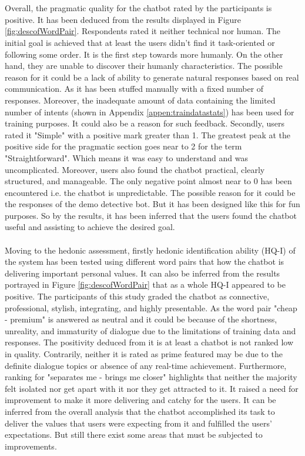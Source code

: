 \\~\\
Overall, the pragmatic quality for the chatbot rated by the participants is positive. It has been deduced from the results displayed in Figure \ref{fig:descofWordPair}. Respondents rated it neither technical nor human. The initial goal is achieved that at least the users didn't find it task-oriented or following some order. It is the first step towards more humanly. On the other hand, they are unable to discover their humanly characteristics. The possible reason for it could be a lack of ability to generate natural responses based on real communication. As it has been stuffed manually with a fixed number of responses. Moreover, the inadequate amount of data containing the limited number of intents (shown in Appendix \ref{appen:traindatastats}) has been used for training purposes. It could also be a reason for such feedback. Secondly, users rated it "Simple" with a positive mark greater than 1. The greatest peak at the positive side for the pragmatic section goes near to 2 for the term "Straightforward". Which means it was easy to understand and was uncomplicated. Moreover, users also found the chatbot practical, clearly structured, and manageable. The only negative point almost near to 0 has been encountered i.e. the chatbot is unpredictable. The possible reason for it could be the responses of the demo detective bot. But it has been designed like this for fun purposes. So by the results, it has been inferred that the users found the chatbot useful and assisting to achieve the desired goal.
\\~\\
Moving to the hedonic assessment, firstly hedonic identification ability (HQ-I) of the system has been tested using different word pairs that how the chatbot is delivering important personal values. It can also be inferred from the results portrayed in Figure \ref{fig:descofWordPair} that as a whole HQ-I appeared to be positive. The participants of this study graded the chatbot as connective, professional, stylish, integrating, and highly presentable. As the word pair "cheap - premium" is answered as neutral and it could be because of the shortness, unreality, and immaturity of dialogue due to the limitations of training data and responses. The positivity deduced from it is at least a chatbot is not ranked low in quality. Contrarily, neither it is rated as prime featured may be due to the definite dialogue topics or absence of any real-time achievement. Furthermore, ranking for "separates me - brings me closer" highlights that neither the majority felt isolated nor get apart with it nor they get attracted to it. It raised a need for improvement to make it more delivering and catchy for the users. It can be inferred from the overall analysis that the chatbot accomplished its task to deliver the values that users were expecting from it and fulfilled the users' expectations. But still there exist some areas that must be subjected to improvements.

